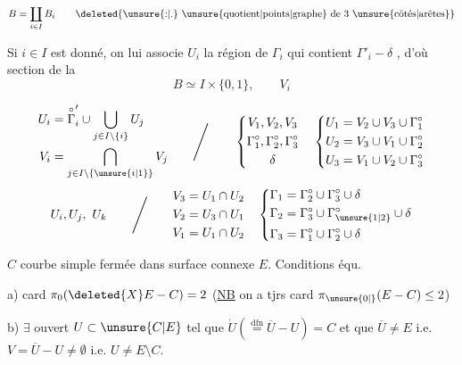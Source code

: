 \[
 B=\coprod_{i\in I} B_i\qquad
 \text{\deleted{\unsure{:|.} \unsure{quotient|points|graphe} de 3 \unsure{côtés|arêtes}}}
\]

Si $i\in I$ est donné, on lui associe $U_i$ la région de $\Gamma_i$ qui contient $\Gamma'_i-\delta$ , d'où section de la 
\[
 B\simeq I\times\{0,1\},\qquad V_i
\]

\[
\begin{aligned}
 U_i&=\overset{\circ}{\Gamma}'_i\cup\bigcup_{j\in I\setminus\{i\}}U_j\\
 V_i&=\bigcap_{j\in I\setminus\{\unsure{i|1}\}}V_j
\end{aligned}
\qquad\Bigg/\qquad
\left\{\begin{gathered}
 V_1,V_2,V_3\\ \Gamma_1^\circ,\Gamma_2^\circ,\Gamma_3^\circ\\ \delta
\end{gathered}\right.
\quad
\left\{\begin{aligned}
 U_1&=V_2\cup V_3\cup\Gamma_1^\circ\\
 U_2&=V_3\cup V_1\cup\Gamma_2^\circ\\
 U_3&=V_1\cup V_2\cup\Gamma_3^\circ
\end{aligned}\right.
\]
\[
 U_i,U_j,\ U_k\qquad\Bigg/\qquad
\begin{aligned}
 V_3&=U_1\cap U_2\\
 V_2&=U_3\cap U_1\\
 V_1&=U_1\cap U_2
\end{aligned}
\quad
\left\{\begin{aligned}
 \Gamma_1&=\Gamma_2^\circ\cup\Gamma_3^\circ\cup\delta\\
 \Gamma_2&=\Gamma_3^\circ\cup\Gamma_{\unsure{1|2}}^\circ\cup\delta\\
 \Gamma_3&=\Gamma_1^\circ\cup\Gamma_2^\circ\cup\delta
\end{aligned}\right.
\]

$C$ courbe simple fermée dans surface connexe $E$. Conditions équ.

a) card $\pi_0(\deleted{X}E-C)=2$ \quad (\uline{NB} on a tjrs card $\pi_{\unsure{0|{}}}(E-C)\le 2$)

b) $\exists$ ouvert $U\subset\unsure{C|E}$ tel que $\dot U(\overset{\text{dfn}}{=}\overline U-U)=C$ et que 
$\overline U\ne E$ i.e. $V=\overline U-U\ne\emptyset$ i.e. $U\ne E\setminus C$.

